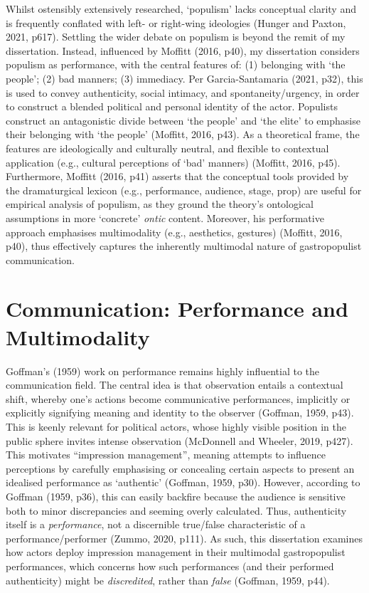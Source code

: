 \documentclass[a4paper, nobind]{templates/ociamthesis}
\begin{document}
Whilst ostensibly extensively researched, `populism' lacks conceptual clarity and is frequently conflated with left- or right-wing ideologies (Hunger and Paxton, 2021, p617). Settling the wider debate on populism is beyond the remit of my dissertation. Instead, influenced by Moffitt (2016, p40), my dissertation considers populism as performance, with the central features of: (1) belonging with `the people'; (2) bad manners; (3) immediacy. Per Garcia-Santamaria (2021, p32), this is used to convey authenticity, social intimacy, and spontaneity/urgency, in order to construct a blended political and personal identity of the actor. Populists construct an antagonistic divide between `the people' and `the elite' to emphasise their belonging with `the people' (Moffitt, 2016, p43). As a theoretical frame, the features are ideologically and culturally neutral, and flexible to contextual application (e.g., cultural perceptions of `bad' manners) (Moffitt, 2016, p45). Furthermore, Moffitt (2016, p41) asserts that the conceptual tools provided by the dramaturgical lexicon (e.g., performance, audience, stage, prop) are useful for empirical analysis of populism, as they ground the theory's ontological assumptions in more `concrete' \emph{ontic} content. Moreover, his performative approach emphasises multimodality (e.g., aesthetics, gestures) (Moffitt, 2016, p40), thus effectively captures the inherently multimodal nature of gastropopulist communication.

\hypertarget{communication-performance-and-multimodality}{%
\section{Communication: Performance and Multimodality}\label{communication-performance-and-multimodality}}

Goffman's (1959) work on performance remains highly influential to the communication field.
The central idea is that observation entails a contextual shift, whereby one's actions become communicative performances, implicitly or explicitly signifying meaning and identity to the observer (Goffman, 1959, p43). This is keenly relevant for political actors, whose highly visible position in the public sphere invites intense observation (McDonnell and Wheeler, 2019, p427).
This motivates ``impression management'', meaning attempts to influence perceptions by carefully emphasising or concealing certain aspects to present an idealised performance as `authentic' (Goffman, 1959, p30). However, according to Goffman (1959, p36), this can easily backfire because the audience is sensitive both to minor discrepancies and seeming overly calculated. Thus, authenticity itself is a \emph{performance}, not a discernible true/false characteristic of a performance/performer (Zummo, 2020, p111). As such, this dissertation examines how actors deploy impression management in their multimodal gastropopulist performances, which concerns how such performances (and their performed authenticity) might be \emph{discredited}, rather than \emph{false} (Goffman, 1959, p44).
\end{document}
